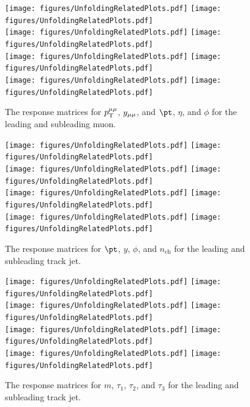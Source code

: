 \begin{figure}[h!]
  \centering
  \texttt{[image: figures/UnfoldingRelatedPlots.pdf]}
  \texttt{[image: figures/UnfoldingRelatedPlots.pdf]} \\
  \texttt{[image: figures/UnfoldingRelatedPlots.pdf]}
  \texttt{[image: figures/UnfoldingRelatedPlots.pdf]} \\
  \texttt{[image: figures/UnfoldingRelatedPlots.pdf]}
  \texttt{[image: figures/UnfoldingRelatedPlots.pdf]} \\
  \texttt{[image: figures/UnfoldingRelatedPlots.pdf]}
  \texttt{[image: figures/UnfoldingRelatedPlots.pdf]}
  \caption{The response matrices for $p_\mathrm{T}^{\mu\mu}$, $y_{\mu\mu}$, and $\pt$, $\eta$, and $\phi$ for the leading and subleading muon.}
  \label{fig:migMatDilep}
\end{figure}

\begin{figure}[h!]
  \centering
  \texttt{[image: figures/UnfoldingRelatedPlots.pdf]}
  \texttt{[image: figures/UnfoldingRelatedPlots.pdf]} \\
  \texttt{[image: figures/UnfoldingRelatedPlots.pdf]}
  \texttt{[image: figures/UnfoldingRelatedPlots.pdf]} \\
  \texttt{[image: figures/UnfoldingRelatedPlots.pdf]}
  \texttt{[image: figures/UnfoldingRelatedPlots.pdf]} \\
  \texttt{[image: figures/UnfoldingRelatedPlots.pdf]}
  \texttt{[image: figures/UnfoldingRelatedPlots.pdf]}
  \caption{The response matrices for $\pt$, $y$, $\phi$, and $n_{\text{ch}}$ for the leading and subleading track jet.}
  \label{fig:migMatTJ1}
\end{figure}

\begin{figure}[h!]
  \centering
  \texttt{[image: figures/UnfoldingRelatedPlots.pdf]}
  \texttt{[image: figures/UnfoldingRelatedPlots.pdf]} \\
  \texttt{[image: figures/UnfoldingRelatedPlots.pdf]}
  \texttt{[image: figures/UnfoldingRelatedPlots.pdf]} \\
  \texttt{[image: figures/UnfoldingRelatedPlots.pdf]}
  \texttt{[image: figures/UnfoldingRelatedPlots.pdf]} \\
  \texttt{[image: figures/UnfoldingRelatedPlots.pdf]}
  \texttt{[image: figures/UnfoldingRelatedPlots.pdf]}
  \caption{The response matrices for $m$, $\tau_1$, $\tau_2$, and $\tau_3$ for the leading and subleading track jet.}
  \label{fig:migMatTJ2}
\end{figure}

